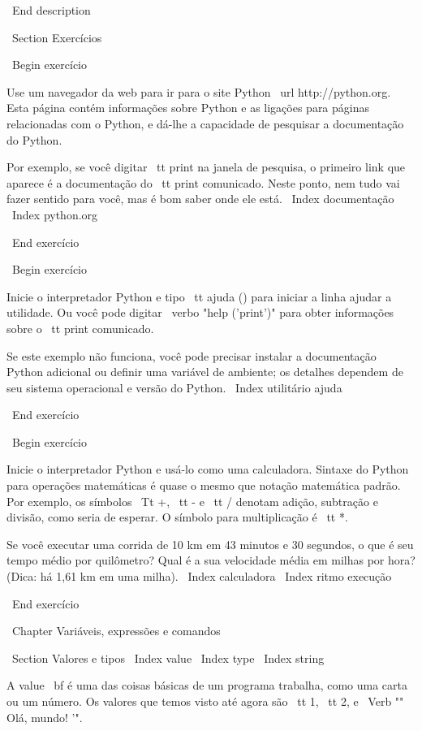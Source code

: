 \documentclass[10pt]{book}
\begin{document}
{\ End {description}


\ Section {Exercícios}

\ Begin {} exercício

Use um navegador da web para ir para o site Python \ url {http://python.org}.
Esta página contém informações sobre Python e as ligações
para páginas relacionadas com o Python, e dá-lhe a capacidade de pesquisar
a documentação do Python.

Por exemplo, se você digitar {\ tt print} na janela de pesquisa, o
primeiro link que aparece é a documentação do {\ tt print}
comunicado. Neste ponto, nem tudo vai fazer sentido para você,
mas é bom saber onde ele está.
\ Index {} documentação
\ Index {} python.org

\ End {} exercício

\ Begin {} exercício

Inicie o interpretador Python e tipo {\ tt ajuda ()} para iniciar a linha
ajudar a utilidade. Ou você pode digitar \ verbo "help ('print')" para obter informações
sobre o {\ tt print} comunicado.

Se este exemplo não funciona, você
pode precisar instalar a documentação Python adicional ou definir uma
variável de ambiente; os detalhes dependem de seu sistema operacional e
versão do Python.
\ Index {utilitário ajuda}

\ End {} exercício

\ Begin {} exercício

Inicie o interpretador Python e usá-lo como uma calculadora.
Sintaxe do Python para operações matemáticas é quase o mesmo que
notação matemática padrão. Por exemplo, os símbolos
{\ Tt +}, {\ tt -} e {\ tt /} denotam adição, subtração
e divisão, como seria de esperar. O símbolo para
multiplicação é {\ tt *}.

Se você executar uma corrida de 10 km em 43 minutos e 30 segundos, o que é seu
tempo médio por quilômetro? Qual é a sua velocidade média em milhas por hora?
(Dica: há 1,61 km em uma milha).
\ Index {calculadora}
\ Index {ritmo execução}

\ End {} exercício




\ Chapter {Variáveis, expressões e comandos}

\ Section {Valores e tipos}
\ Index {value}
\ Index {type}
\ Index {string}

A {value \ bf} é uma das coisas básicas de um programa trabalha,
como uma carta ou um
número. Os valores que temos visto até agora
são {\ tt 1}, {\ tt 2}, e
\ Verb "" Olá, mundo! '".

}
\end{document}
